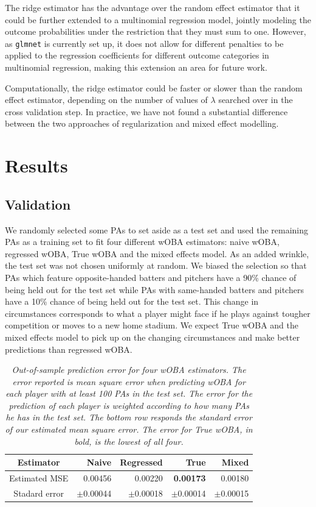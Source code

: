 \documentclass[11pt]{article}
\begin{document}
The ridge estimator has the advantage over the random effect estimator that it
could be further extended to a multinomial regression model, jointly modeling
the outcome probabilities under the restriction that they must sum to one.
However, as {\tt glmnet} is currently set up, it does not allow for
different penalties to be applied to the regression coefficients for different
outcome categories in multinomial regression, making this extension an area for
future work.

Computationally, the ridge estimator could be faster or slower than the random
effect estimator, depending on the number of values of $\lambda$ searched over
in the cross validation step. In practice, we have not found a substantial
difference between the two approaches of regularization and mixed effect
modelling.




\section{Results}
\label{sec-results}


\subsection{Validation}
\label{sub-validation}

We randomly selected some PAs to set aside as a test set and used the remaining
PAs as a training set to fit four different wOBA estimators: naive
wOBA, regressed wOBA, True wOBA and the mixed effects model. As an added
wrinkle, the test
set was not chosen uniformly at random. We biased the selection so that PAs
which feature opposite-handed batters and pitchers have a 90\% chance of being
held out for the test set while PAs with same-handed batters and pitchers have
a 10\% chance of being held out for the test set. This change in circumstances
corresponds to what a player might face if he plays against tougher competition
or moves to a new home stadium. We expect True wOBA and the mixed effects model
to pick up on the changing circumstances and make better predictions than
regressed wOBA.

\begin{table}
\caption{\it Out-of-sample prediction error for four wOBA estimators. The error
    reported is mean square error when predicting wOBA for each player with at
    least 100 PAs in the test set. The error for the prediction of each player
    is weighted according to how many PAs he has in the test set. The bottom
    row responds the standard error of our estimated mean square error. The
    error for True wOBA, in bold, is the lowest of all four.}
\centering
\begin{tabular}{c|rrrr}
Estimator           &  Naive    & Regressed & True          & Mixed\\
\hline
Estimated MSE       & 0.00456   & 0.00220   & {\bf 0.00173} & 0.00180\\
Stadard error       &$\pm$0.00044&$\pm$0.00018&$\pm$0.00014 &$\pm$0.00015
\end{tabular}
\label{tab-validation}
\end{table}
\end{document}
